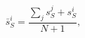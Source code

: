 \documentclass[12pt]{article}
\begin{document}
\thispagestyle{empty}

$$
  \bar{s}_S^i  = \frac{\sum_j s_S^j + s_S^i}{N + 1} ,
$$
\end{document}

